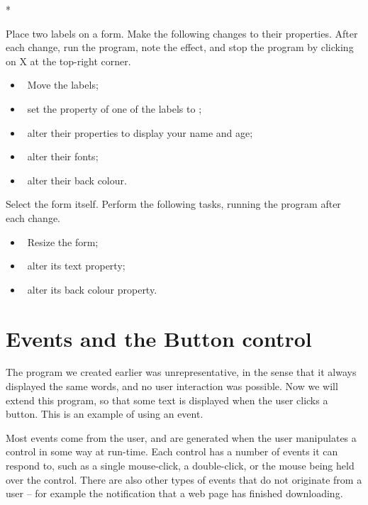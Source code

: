 		\begin{stqb}*
			\begin{STQ}
				\item	Place two labels on a form. Make the following changes to their properties. After each change, run the program, note the effect, and stop the program by clicking on X at the top-right corner.
					\begin{itemize}
						\item Move the labels;
						\item set the  property of one of the labels to ;
						\item alter their  properties to display your name and age;
						\item alter their fonts;
						\item alter their back colour.
					\end{itemize}
				\item Select the form itself. Perform the following tasks, running the program after each change.
					\begin{itemize}
						\item Resize the form;
						\item alter its text property;
						\item alter its back colour property.
					\end{itemize}
			\end{STQ}
		\end{stqb}
		
	\section{Events and the Button control}
		The program we created earlier was unrepresentative, in the sense that it always displayed the same words, and no user interaction was possible. Now we will extend this program, so that some text is displayed when the user clicks a button. This is an example of using an event.

		Most events come from the user, and are generated when the user manipulates a control in some way at run-time. Each control has a number of events it can respond to, such as a single mouse-click, a double-click, or the mouse being held over the control. There are also other types of events that do not originate from a user – for example the notification that a web page has finished downloading.

